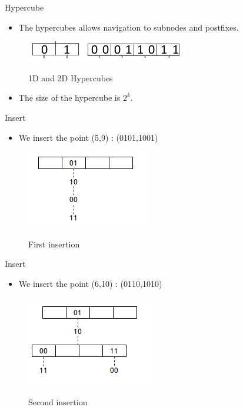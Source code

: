 \documentclass{beamer}
\begin{document}
\begin{frame}{Hypercube}
  \begin{itemize}
   \item The hypercubes allows navigation to subnodes and postfixes.
  \end{itemize}
  \begin{figure}
   \centering
   \includegraphics[scale = 0.7]{4.png}
   \label{fig4}
   \caption{1D and 2D Hypercubes}
  \end{figure}
  \begin{itemize}
   \item The size of the hypercube is $2^{k}$.
  \end{itemize}
\end{frame}

\begin{frame}{Insert}
 \begin{itemize}
  \item We insert the point (5,9) : (0101,1001)
 \end{itemize}
 
 \begin{figure}
   \centering
   \includegraphics{5.png}
   \label{fig5}
   \caption{First insertion}
 \end{figure}
\end{frame}


\begin{frame}{Insert}
  \begin{itemize}
   \item We insert the point (6,10) : (0110,1010)
  \end{itemize}
  
  \begin{figure}
   \centering
   \includegraphics{6.png}
   \label{fig6}
   \caption{Second insertion}
  \end{figure}
\end{frame}
\end{document}
